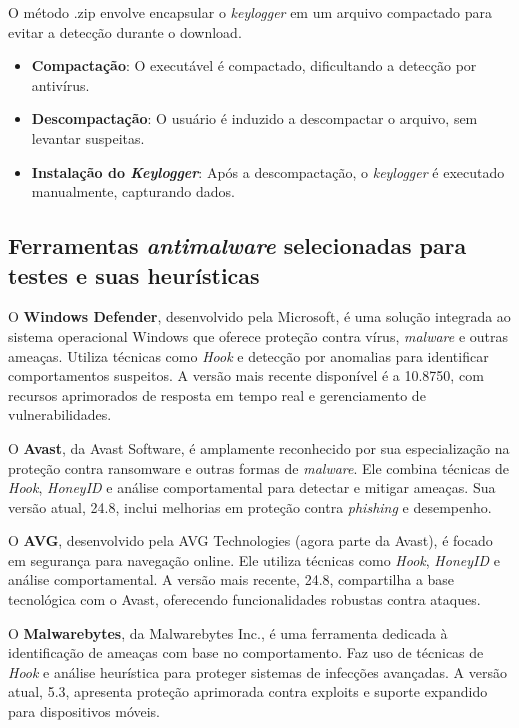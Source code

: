 \documentclass[12pt]{article}
\begin{document}
O método .zip envolve encapsular o \textit{keylogger} em um arquivo compactado para evitar a detecção durante o download.

\begin{itemize}
    \item \textbf{Compactação}: O executável é compactado, dificultando a detecção por antivírus.
    \item \textbf{Descompactação}: O usuário é induzido a descompactar o arquivo, sem levantar suspeitas.
    \item \textbf{Instalação do \textit{Keylogger}}: Após a descompactação, o \textit{keylogger} é executado manualmente, capturando dados.
\end{itemize}

\subsection{Ferramentas \textit{antimalware} selecionadas para testes e suas heurísticas}

O \textbf{Windows Defender}, desenvolvido pela Microsoft, é uma solução integrada ao sistema operacional Windows que oferece proteção contra vírus, \textit{malware} e outras ameaças. Utiliza técnicas como \textit{Hook} e detecção por anomalias para identificar comportamentos suspeitos. A versão mais recente disponível é a 10.8750, com recursos aprimorados de resposta em tempo real e gerenciamento de vulnerabilidades.

O \textbf{Avast}, da Avast Software, é amplamente reconhecido por sua especialização na proteção contra ransomware e outras formas de \textit{malware}. Ele combina técnicas de \textit{Hook}, \textit{HoneyID} e análise comportamental para detectar e mitigar ameaças. Sua versão atual, 24.8, inclui melhorias em proteção contra \textit{phishing} e desempenho.

O \textbf{AVG}, desenvolvido pela AVG Technologies (agora parte da Avast), é focado em segurança para navegação online. Ele utiliza técnicas como \textit{Hook}, \textit{HoneyID} e análise comportamental. A versão mais recente, 24.8, compartilha a base tecnológica com o Avast, oferecendo funcionalidades robustas contra ataques.

O \textbf{Malwarebytes}, da Malwarebytes Inc., é uma ferramenta dedicada à identificação de ameaças com base no comportamento. Faz uso de técnicas de \textit{Hook} e análise heurística para proteger sistemas de infecções avançadas. A versão atual, 5.3, apresenta proteção aprimorada contra exploits e suporte expandido para dispositivos móveis.
\end{document}
